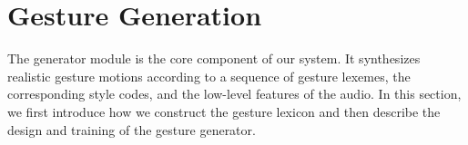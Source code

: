 











\section{Gesture Generation}
\label{sec:gesture_generation}
The generator module is the core component of our system. It synthesizes realistic gesture motions according to a sequence of gesture lexemes, the corresponding style codes, and the low-level features of the audio. In this section, we first introduce how we construct the gesture lexicon and then describe the design and training of the gesture generator.

